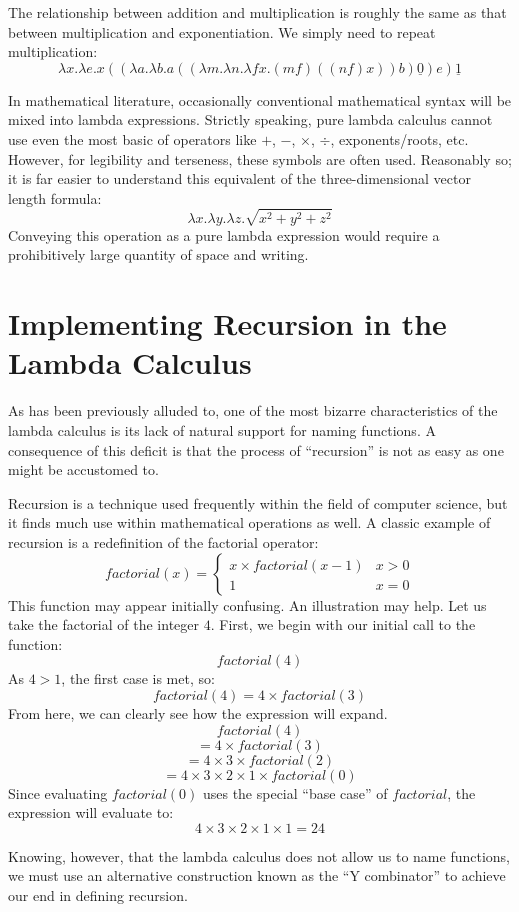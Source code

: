 \documentclass[twocolumn,titlepage,12pt]{article}
\begin{document}
The relationship between addition and multiplication is roughly the same as that between multiplication and exponentiation. We simply need to repeat multiplication:
$$\lambda x.\lambda e.x ((\lambda a.\lambda b.a ((\lambda m.\lambda n.\lambda fx.(m f) ((n f) x)) b) \underline{0}) e) \underline{1}$$

In mathematical literature, occasionally conventional mathematical syntax will be mixed into lambda expressions. Strictly speaking, pure lambda calculus cannot use even the most basic of operators like $+$, $-$, $\times$, $\div$, exponents/roots, etc. However, for legibility and terseness, these symbols are often used. Reasonably so; it is far easier to understand this equivalent of the three-dimensional vector length formula:
$$\lambda x.\lambda y.\lambda z.\sqrt{x^2+y^2+z^2}$$
Conveying this operation as a pure lambda expression would require a prohibitively large quantity of space and writing.

\section{Implementing Recursion in the Lambda Calculus}
As has been previously alluded to, one of the most bizarre characteristics of the lambda calculus is its lack of natural support for naming functions. A consequence of this deficit is that the process of ``recursion'' is not as easy as one might be accustomed to.

Recursion is a technique used frequently within the field of computer science, but it finds much use within mathematical operations as well. A classic example of recursion is a redefinition of the factorial operator:
\[
factorial(x)=
\begin{cases}
    x\times factorial(x-1) & x>0 \\
    1 & x=0
\end{cases}
\]
This function may appear initially confusing. An illustration may help. Let us take the factorial of the integer $4$. First, we begin with our initial call to the function:
$$factorial(4)$$
As $4>1$, the first case is met, so:
$$factorial(4)=4\times factorial(3)$$
From here, we can clearly see how the expression will expand.
$$factorial(4)$$
$$=4\times factorial(3)$$
$$=4\times 3\times factorial(2)$$
$$=4\times 3\times 2\times 1\times factorial(0)$$
Since evaluating $factorial(0)$ uses the special ``base case'' of $factorial$, the expression will evaluate to:
$$4\times 3\times 2\times 1\times 1=24$$

Knowing, however, that the lambda calculus does not allow us to name functions, we must use an alternative construction known as the ``Y combinator'' to achieve our end in defining recursion.
\end{document}
